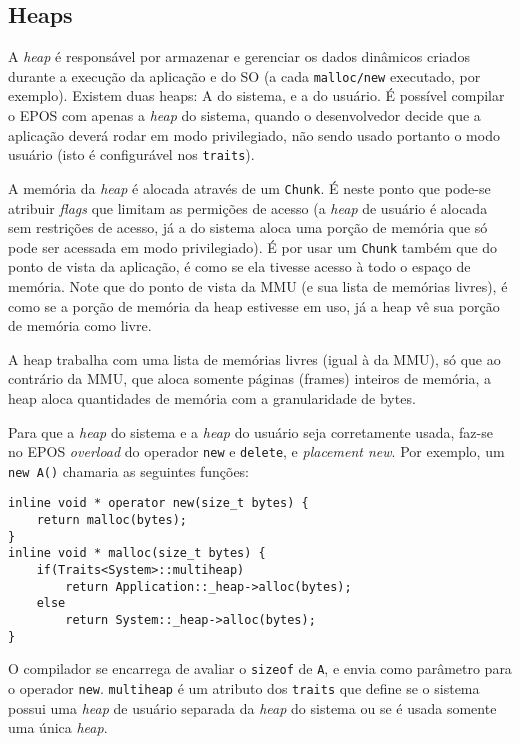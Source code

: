 
\subsection{Heaps}

A \emph{heap} é responsável por armazenar e gerenciar os dados dinâmicos criados durante a execução da aplicação e do SO (a cada \verb+malloc/new+ executado, por exemplo). Existem duas heaps: A do sistema, e a do usuário. É possível compilar o EPOS com apenas a \emph{heap} do sistema, quando o desenvolvedor decide que a aplicação deverá rodar em modo privilegiado, não sendo usado portanto o modo usuário (isto é configurável nos \verb+traits+).

A memória da \emph{heap} é alocada através de um \verb+Chunk+. É neste ponto que pode-se atribuir \emph{flags} que limitam as permições de acesso (a \emph{heap} de usuário é alocada sem restrições de acesso, já a do sistema aloca uma porção de memória que só pode ser acessada em modo privilegiado). É por usar um \verb+Chunk+ também que do ponto de vista da aplicação, é como se ela tivesse acesso à todo o espaço de memória. Note que do ponto de vista da MMU (e sua lista de memórias livres), é como se a porção de memória da heap estivesse em uso, já a heap vê sua porção de memória como livre.

A heap trabalha com uma lista de memórias livres (igual à da MMU), só que ao contrário da MMU, que aloca somente páginas (frames) inteiros de memória, a heap aloca quantidades de memória com a granularidade de bytes.

Para que a \emph{heap} do sistema e a \emph{heap} do usuário seja corretamente usada, faz-se no EPOS \emph{overload} do operador \verb+new+ e \verb+delete+, e \emph{placement new}. Por exemplo, um \verb+new A()+ chamaria as seguintes funções:

\begin{lstlisting}
inline void * operator new(size_t bytes) {
    return malloc(bytes);
}
inline void * malloc(size_t bytes) {
    if(Traits<System>::multiheap)
        return Application::_heap->alloc(bytes);
    else
        return System::_heap->alloc(bytes);
}
\end{lstlisting}

O compilador se encarrega de avaliar o \verb+sizeof+ de \verb+A+, e envia como parâmetro para o operador \verb+new+. \verb+multiheap+ é um atributo dos \verb+traits+ que define se o sistema possui uma \emph{heap} de usuário separada da \emph{heap} do sistema ou se é usada somente uma única \emph{heap}.

